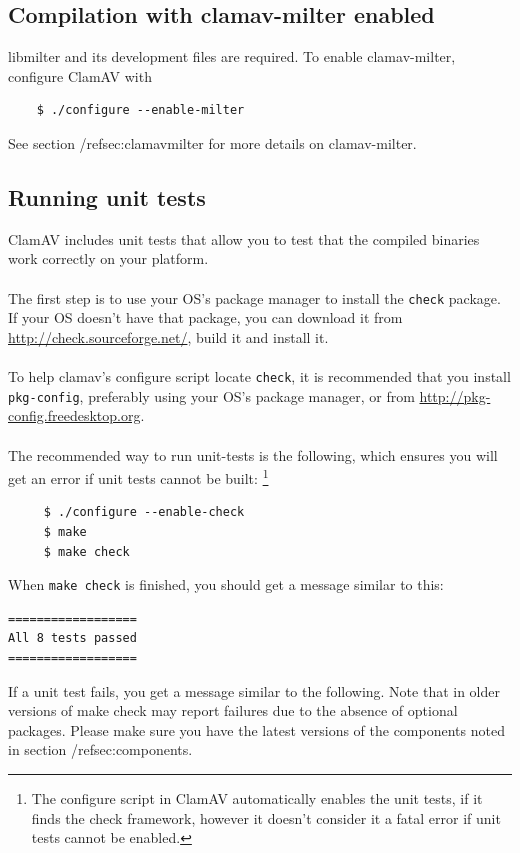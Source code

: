 \documentclass[a4paper,titlepage,12pt]{article}
\begin{document}
    \subsection{Compilation with clamav-milter enabled}
    libmilter and its development files are required. To enable clamav-milter,
    configure ClamAV with
    \begin{verbatim}
	$ ./configure --enable-milter
    \end{verbatim}
    See section /ref{sec:clamavmilter} for more details on clamav-milter.

    \subsection{Running unit tests}\label{unit-testing}
	ClamAV includes unit tests that allow you to test that the compiled binaries work correctly on your platform.
        \\\\
	The first step is to use your OS's package manager to install the \verb+check+ package. 
	If your OS doesn't have that package, you can download it from \url{http://check.sourceforge.net/}, 
	build it and install it.
        \\\\
	To help clamav's configure script locate \verb+check+, it is recommended that you install \verb+pkg-config+, preferably
	using your OS's package manager, or from \url{http://pkg-config.freedesktop.org}.
        \\\\
	The recommended way to run unit-tests is the following, which ensures you will get an error if unit tests cannot be built:
	\footnote{The configure script in ClamAV automatically enables the unit tests, if it finds the check framework, however it doesn't consider it a fatal error if unit tests cannot be enabled.}
	\begin{verbatim}
	 $ ./configure --enable-check
	 $ make
	 $ make check
	\end{verbatim}
	When \verb+make check+ is finished, you should get a message similar to this:
	\begin{verbatim}
==================
All 8 tests passed
==================
	\end{verbatim}
	If a unit test fails, you get a message similar to the following.
        Note that in older versions of make check may report failures due to
        the absence of optional packages. Please make sure you have the
        latest versions of the components noted in section /ref{sec:components}.
\end{document}

